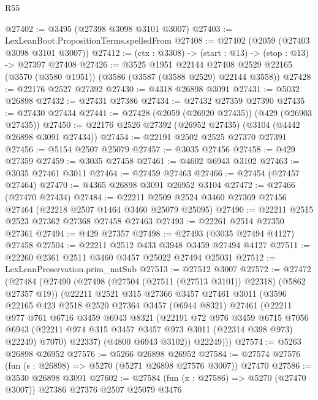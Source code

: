 \begin{lexlean}{R55}
\begin{coremodule}
@27402 := @3495 (@27398 @3098 @3101 @3007)
@27403 := LexLeanBoot.PropositionTerms.spelledFrom
@27408 := @27402 (@2059 (@27403 @3098 @3101 @3007))
@27412 := (ctx : @3308) -> (start : @13) -> (stop : @13) -> @27397 @27408
@27426 := @3525
    @1951
    @22144
    @27408
    @2529
    @22165
    (@3570 (@3580 @1951))
    (@3586 (@3587 (@3588 @2529) @22144 @3558))
@27428 := @22176 @2527 @27392
@27430 := @4318 @26898 @3091
@27431 := @5032 @26898
@27432 := @27431 @27386
@27434 := @27432 @27359 @27390
@27435 := @27430 @27434
@27441 := @27428 (@2059 (@26920 @27435)) (@429 (@26903 @27435))
@27450 := @22176 @2526 @27392 (@26952 @27435) (@3104 (@4442 @26898 @3091 @27434))
@27454 := @22191 @2502 @2525 @27370 @27391
@27456 := @5154 @2507 @25079
@27457 := @3035 @27456
@27458 := @429 @27359
@27459 := @3035 @27458
@27461 := @4602 @6943 @3102
@27463 := @3035 @27461 @3011
@27464 := @27459 @27463
@27466 := @27454 (@27457 @27464)
@27470 := @4365 @26898 @3091 @26952 @3104
@27472 := @27466 (@27470 @27434)
@27484 := @22211 @2509 @2524 @3460 @27369 @27456 @27464 (@22218 @2507 @1464 @3460 @25079 @25095)
@27490 := @22211 @2515 @2523 @27362 @27368 @27458 @27463
@27493 := @22261 @2514 @27350 @27361
@27494 := @429 @27357
@27498 := @27493 (@3035 @27494 @4127) @27458
@27504 := @22211 @2512 @433 @3948 @3459 @27494 @4127
@27511 := @22260 @2361 @2511 @3460 @3457 @25022 @27494 @25031
@27512 := LexLeanPreservation.prim_natSub
@27513 := @27512 @3007
@27572 := @27472
    (@27484
      (@27490
        (@27498 (@27504 (@27511 (@27513 @3101)) @22318) (@5862 @27357 @19))
        (@22211
          @2521
          @315
          @27366
          @3457
          @27461
          @3011
          (@3596
            @22165
            @423
            @2518
            @2520
            @27364
            @3457
            (@6944 @8321)
            @27461
            (@22211
              @977
              @761
              @6716
              @3459
              @6943
              @8321
              (@22191
                @72
                @976
                @3459
                @6715
                @7056
                @6943
                (@22211 @974 @315 @3457 @3457 @973 @3011 (@22314 @398 @973) @22249)
                @7070)
              @22337)
            (@4800 @6943 @3102))
          @22249)))
@27574 := @5263 @26898 @26952
@27576 := @5266 @26898 @26952
@27584 := @27574 @27576 (fun (s : @26898) => @5270 (@5271 @26898 @27576 @3007)) @27470
@27586 := @3530 @26898 @3091
@27602 := @27584
    (fun (x : @27586) => @5270 (@27470 @3007))
    @27386
    @27376
    @2507
    @25079
    @3476

\end{coremodule}
\end{lexlean}
